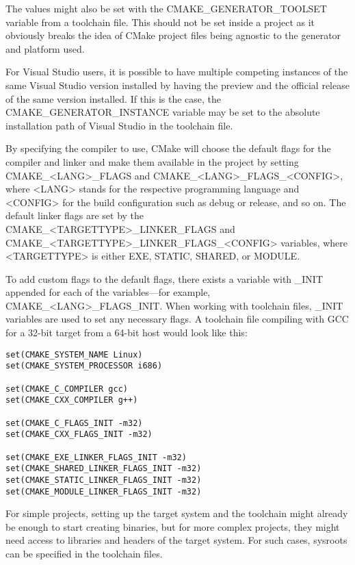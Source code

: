 The values might also be set with the CMAKE\_GENERATOR\_TOOLSET variable from a toolchain file. This should not be set inside a project as it obviously breaks the idea of CMake project files being agnostic to the generator and platform used.

For Visual Studio users, it is possible to have multiple competing instances of the same Visual Studio version installed by having the preview and the official release of the same version installed. If this is the case, the CMAKE\_GENERATOR\_INSTANCE variable may be set to the absolute installation path of Visual Studio in the toolchain file.

By specifying the compiler to use, CMake will choose the default flags for the compiler and linker and make them available in the project by setting CMAKE\_<LANG>\_FLAGS and CMAKE\_<LANG>\_FLAGS\_<CONFIG>, where <LANG> stands for the respective programming language and <CONFIG> for the build configuration such as debug or release, and so on. The default linker flags are set by the CMAKE\_<TARGETTYPE>\_LINKER\_FLAGS and CMAKE\_<TARGETTYPE>\_LINKER\_FLAGS\_<CONFIG> variables, where <TARGETTYPE> is either EXE, STATIC, SHARED, or MODULE.

To add custom flags to the default flags, there exists a variable with \_INIT appended for each of the variables—for example, CMAKE\_<LANG>\_FLAGS\_INIT. When working with toolchain files, \_INIT variables are used to set any necessary flags. A toolchain file compiling with GCC for a 32-bit target from a 64-bit host would look like this:

\begin{lstlisting}[style=styleCMake]
set(CMAKE_SYSTEM_NAME Linux)
set(CMAKE_SYSTEM_PROCESSOR i686)

set(CMAKE_C_COMPILER gcc)
set(CMAKE_CXX_COMPILER g++)

set(CMAKE_C_FLAGS_INIT -m32)
set(CMAKE_CXX_FLAGS_INIT -m32)

set(CMAKE_EXE_LINKER_FLAGS_INIT -m32)
set(CMAKE_SHARED_LINKER_FLAGS_INIT -m32)
set(CMAKE_STATIC_LINKER_FLAGS_INIT -m32)
set(CMAKE_MODULE_LINKER_FLAGS_INIT -m32)
\end{lstlisting}

For simple projects, setting up the target system and the toolchain might already be enough to start creating binaries, but for more complex projects, they might need access to libraries and headers of the target system. For such cases, sysroots can be specified in the toolchain files.


